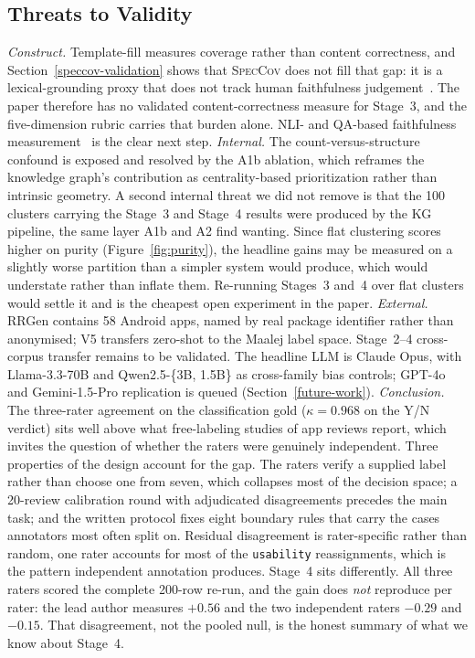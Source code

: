 \documentclass[preprint,12pt]{elsarticle}
\begin{document}
\subsection{Threats to Validity}
\emph{Construct.} Template-fill measures coverage rather than content correctness, and Section~\ref{speccov-validation} shows that \textsc{SpecCov} does not fill that gap: it is a lexical-grounding proxy that does not track human faithfulness judgement~\cite{grusky2018newsroom, maynez2020faithfulness, kryscinski2020evaluating, ji2023survey}. The paper therefore has no validated content-correctness measure for Stage~3, and the five-dimension rubric carries that burden alone. NLI- and QA-based faithfulness measurement~\cite{laban2022summac, honovich2022true, durmus2020feqa} is the clear next step.
\emph{Internal.} The count-versus-structure confound is exposed and resolved by the A1b ablation, which reframes the knowledge graph's contribution as centrality-based prioritization rather than intrinsic geometry. A second internal threat we did not remove is that the 100 clusters carrying the Stage~3 and Stage~4 results were produced by the KG pipeline, the same layer A1b and A2 find wanting. Since flat clustering scores higher on purity (Figure~\ref{fig:purity}), the headline gains may be measured on a slightly worse partition than a simpler system would produce, which would understate rather than inflate them. Re-running Stages~3 and~4 over flat clusters would settle it and is the cheapest open experiment in the paper.
\emph{External.} RRGen contains 58 Android apps, named by real package identifier rather than
anonymised; V5 transfers zero-shot to the Maalej label space. Stage~2--4 cross-corpus transfer remains to be validated. The headline LLM is Claude Opus, with Llama-3.3-70B and Qwen2.5-\{3B, 1.5B\} as cross-family bias controls; GPT-4o and Gemini-1.5-Pro replication is queued (Section~\ref{future-work}).
\emph{Conclusion.} The three-rater agreement on the classification gold ($\kappa = 0.968$ on the Y/N verdict) sits well above what free-labeling studies of app reviews report, which invites the question of whether the raters were genuinely independent. Three properties of the design account for the gap. The raters verify a supplied label rather than choose one from seven, which collapses most of the decision space; a 20-review calibration round with adjudicated disagreements precedes the main task; and the written protocol fixes eight boundary rules that carry the cases annotators most often split on. Residual disagreement is rater-specific rather than random, one rater accounts for most of the \texttt{usability} reassignments, which is the pattern independent annotation produces. Stage~4 sits differently. All three raters scored the complete 200-row re-run, and the gain does \emph{not} reproduce per rater: the lead author measures $+0.56$ and the two independent raters $-0.29$ and $-0.15$. That disagreement, not the pooled null, is the honest summary of what we know about Stage~4.
\end{document}
